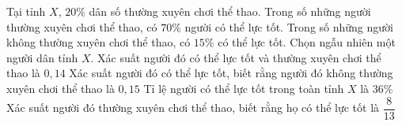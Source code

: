 \begin{ex}%
Tại tỉnh $X$, $20\%$ dân số thường xuyên chơi thể thao. Trong số những người thường xuyên chơi thể thao, có $70\%$ người có thể lực tốt. Trong số những người không thường xuyên chơi thể thao, có $15\%$ có thể lực tốt. Chọn ngẫu nhiên một người dân tỉnh $X$.
\choiceTF
{\True Xác suất người đó có thể lực tốt và thường xuyên chơi thể thao là $0{,}14$}
{\True Xác suất người đó có thể lực tốt, biết rằng người đó không thường xuyên chơi thể thao là $0{,}15$}
{Tỉ lệ người có thể lực tốt trong toàn tỉnh $X$ là $36\%$}
{Xác suất người đó thường xuyên chơi thể thao, biết rằng họ có thể lực tốt là $\dfrac{8}{13}$}
\end{ex}

